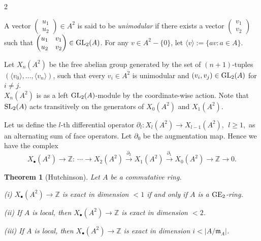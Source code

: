 \documentclass[a0]{sciposter}
\newtheorem{thm}{Theorem}
\theoremstyle{definition}
\newcommand{\z}{\mathbb{Z}}
\newcommand{\mmm}{\mathfrak{m}}
\newcommand{\lan}{\langle}
\newcommand{\ran}{\rangle}
\newcommand{\arr}{\rightarrow}
\newcommand{\larr}{\longrightarrow}
\newcommand{\GE}{{\rm GE}}
\newcommand{\GL}{{\rm GL}}
\newcommand{\SL}{{\rm SL}}
\begin{document}
\begin{multicols}{2}
    
A vector ${\begin{pmatrix} {u_1} \\ {u_2} \end{pmatrix}}\in A^2$ is said to be 
{\it unimodular} if there exists a vector ${\begin{pmatrix} {v_1} \\ {v_2} \end{pmatrix}}$ 
such that $\begin{pmatrix} {u_1} & {v_1} \\ {u_2} & {v_2} \end{pmatrix}\in \GL_2(A)$. 
For any $v\in A^{2}-\{0\}$, let $\lan{ v}\ran := \{a{ v}: a\in A\}$. 

Let $X_n(A^2)$ be the free abelian group generated by the set of $(n+1)$-tuples 
$(\lan{ v_0}\ran, \dots, \lan{ v_n}\ran)$, such that every ${ v_i} \in A^2$ is unimodular and 
$({ v_i}, { v_j}) \in \GL_2(A)$ for $i\neq j$. \\
$X_n(A^2)$ is as a left $\GL_2(A)$-module 
by the coordinate-wise action.
Note that $\SL_2(A)$ acts transitively on the generators of $X_0(A^2)$ and $X_1(A^2)$.
 
Let us define the $l$-th differential operator
$
\partial_l : X_l(A^2) \arr X_{l-1}(A^2), \ \ l\ge 1,
$
as an alternating sum of face operators. Let 
$\partial_{0} $ be the augmentation map.
Hence we have the complex
\[
X_\bullet(A^2)\arr \z: \  \cdots \larr  X_2(A^2) \overset{\partial_2}{\larr} X_1(A^2) 
\overset{\partial_1}{\larr} X_0(A^2) \arr \z \arr 0.
\]

\begin{thm}[Hutchinson]\label{GE2C}
Let $A$ be a commutative ring.
\par {\rm (i)} $X_\bullet(A^2) \arr \z$ is exact in dimension $<1$ if and only if $A$ is a $\GE_2$-ring.
\par {\rm (ii)} If $A$ is local, then $X_\bullet(A^2)\arr \z$ is exact in dimension $< 2$.
\par {\rm (iii)} If $A$ is local, then $X_\bullet(A^2) \arr \z$ is exact in dimension $i < |A/\mmm_A|$.
\end{thm} 



\end{multicols}
\end{document}
